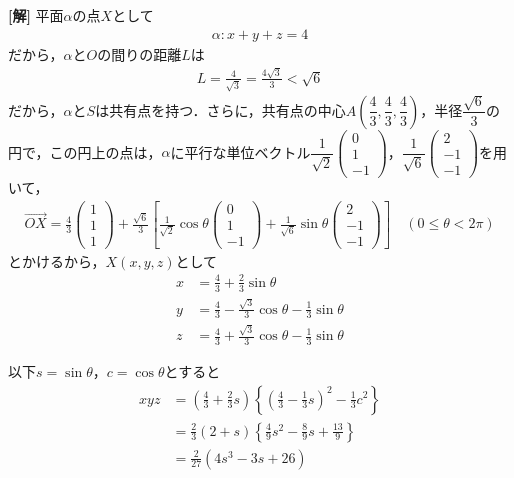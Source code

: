 \documentclass[../main.tex]{subfiles}
\begin{document}
{\bf [解]}
平面$\alpha$の点$X$として
\begin{align*}
  \alpha:x+y+z=4
\end{align*}
だから，$\alpha$と$O$の間りの距離$L$は
\begin{align*}
  L=\frac4{\sqrt3}=\frac{4\sqrt3}3<\sqrt6
\end{align*}
だから，$\alpha$と$S$は共有点を持つ．さらに，共有点の中心$A\left(\dfrac43,\dfrac43,\dfrac43\right)$，半径$\dfrac{\sqrt6}3$の円で，この円上の点は，$\alpha$に平行な単位ベクトル$\dfrac1{\sqrt2}
\begin{pmatrix}0\\1\\-1
\end{pmatrix}$，$\dfrac1{\sqrt6}
\begin{pmatrix}2\\-1\\-1
\end{pmatrix}$を用いて，
\begin{align*}
  \overrightarrow{OX}=\frac43
  \begin{pmatrix}1\\1\\1
  \end{pmatrix}+\frac{\sqrt6}3\left[\frac1{\sqrt2}\cos\theta
    \begin{pmatrix}0\\1\\-1
    \end{pmatrix}+\frac1{\sqrt6}\sin\theta
    \begin{pmatrix}2\\-1\\-1
  \end{pmatrix}\right]\quad(0\le\theta<2\pi)
\end{align*}
とかけるから，$X(x,y,z)$として
\begin{align*}
  x&=\frac43+\frac23\sin\theta\\
  y&=\frac43-\frac{\sqrt3}3\cos\theta-\frac13\sin\theta\\
  z&=\frac43+\frac{\sqrt3}3\cos\theta-\frac13\sin\theta
\end{align*}

以下$s=\sin\theta$，$c=\cos\theta$とすると
\begin{align*}
  xyz&=\left(\frac43+\frac23s\right)\left\{\left(\frac43-\frac13s\right)^2-\frac13c^2\right\}\\
  &=\frac23(2+s)\left\{\frac49s^2-\frac89s+\frac{13}9\right\}\\
  &=\frac2{27}(4s^3-3s+26)
\end{align*}
\end{document}
